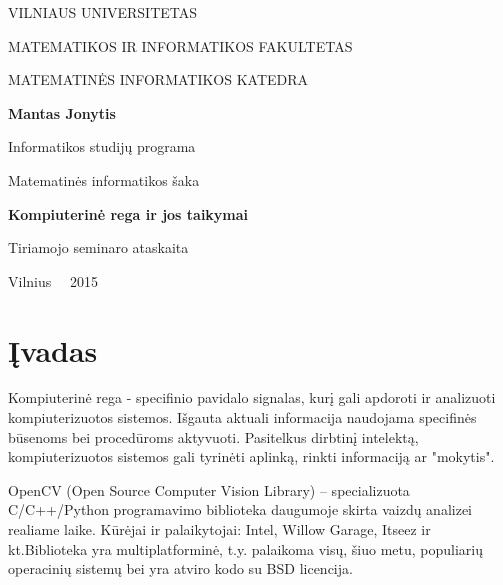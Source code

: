 \documentclass[a4paper,12pt]{article}
\begin{document}
\thispagestyle{empty} %

\begin{center}
 VILNIAUS UNIVERSITETAS 
 
MATEMATIKOS IR INFORMATIKOS FAKULTETAS

MATEMATINĖS INFORMATIKOS KATEDRA

\vspace{4cm}

\textbf{Mantas Jonytis}

Informatikos studijų programa

Matematinės informatikos šaka


\vspace{3cm}

\textbf{\huge Kompiuterinė rega ir jos taikymai}

Tiriamojo seminaro ataskaita

\vspace{4cm}

\vfill

Vilnius \ \  2015
\end{center}

\clearpage


\newpage
\tableofcontents

\newpage

\section*{Įvadas}
Kompiuterinė rega - specifinio pavidalo signalas, kurį gali apdoroti ir analizuoti kompiuterizuotos sistemos. Išgauta aktuali informacija naudojama specifinės būsenoms bei procedūroms aktyvuoti. Pasitelkus dirbtinį intelektą, kompiuterizuotos sistemos gali tyrinėti aplinką, rinkti informaciją ar "mokytis".

OpenCV (Open Source Computer Vision Library) – specializuota C/C++/Python programavimo biblioteka daugumoje skirta vaizdų analizei realiame laike. Kūrėjai ir palaikytojai: Intel, Willow Garage, Itseez ir kt.Biblioteka yra multiplatforminė, t.y. palaikoma visų, šiuo metu, populiarių operacinių sistemų bei yra atviro kodo su BSD licencija.
\end{document}
